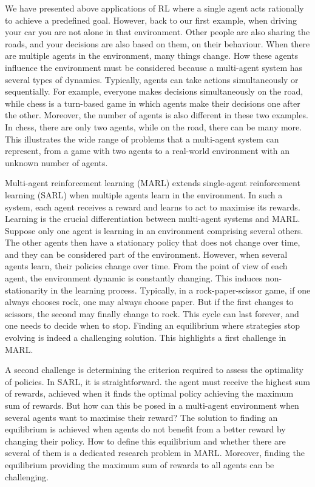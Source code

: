 We have presented above applications of RL where a single agent acts rationally to achieve a predefined goal.
However, back to our first example, when driving your car you are not alone in that environment.
Other people are also sharing the roads, and your decisions are also based on them, on their behaviour.
When there are multiple agents in the environment, many things change.
How these agents influence the environment must be considered because a multi-agent system has several types of dynamics.
Typically, agents can take actions simultaneously or sequentially.
For example, everyone makes decisions simultaneously on the road, while chess is a turn-based game in which agents make their decisions one after the other.
Moreover, the number of agents is also different in these two examples.
In chess, there are only two agents, while on the road, there can be many more.
This illustrates the wide range of problems that a multi-agent system can represent, from a game with two agents to a real-world environment with an unknown number of agents.

Multi-agent reinforcement learning (MARL) extends single-agent reinforcement learning (SARL) when multiple agents learn in the environment.
In such a system, each agent receives a reward and learns to act to maximise its rewards. 
Learning is the crucial differentiation between multi-agent systems and MARL.
Suppose only one agent is learning in an environment comprising several others.
The other agents then have a stationary policy that does not change over time, and they can be considered part of the environment.
However, when several agents learn, their policies change over time.
From the point of view of each agent, the environment dynamic is constantly changing.
This induces non-stationarity in the learning process.
Typically, in a rock-paper-scissor game, if one always chooses rock, one may always choose paper.
But if the first changes to scissors, the second may finally change to rock.
This cycle can last forever, and one needs to decide when to stop.
Finding an equilibrium where strategies stop evolving is indeed a challenging solution.
This highlights a first challenge in MARL.

A second challenge is determining the criterion required to assess the optimality of policies.
In SARL, it is straightforward.
the agent must receive the highest sum of rewards, achieved when it finds the optimal policy achieving the maximum sum of rewards.
But how can this be posed in a multi-agent environment when several agents want to maximise their reward?
The solution to finding an equilibrium is achieved when agents do not benefit from a better reward by changing their policy.
How to define this equilibrium and whether there are several of them is a dedicated research problem in MARL.
Moreover, finding the equilibrium providing the maximum sum of rewards to all agents can be challenging.

